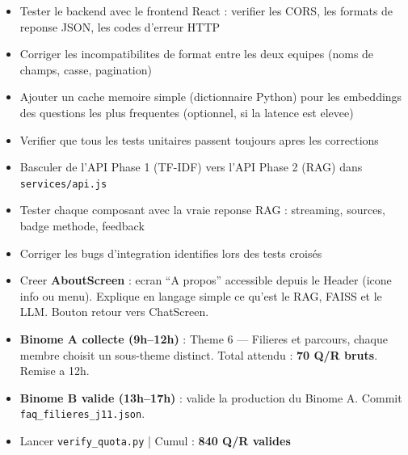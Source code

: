 \documentclass[11pt,a4paper]{article}
\begin{document}
\begin{ragbox}[Backend --- J11]
\begin{itemize}
    \item[$\square$] Tester le backend avec le frontend React : verifier les CORS, les formats de reponse JSON, les codes d'erreur HTTP
    \item[$\square$] Corriger les incompatibilites de format entre les deux equipes (noms de champs, casse, pagination)
    \item[$\square$] Ajouter un cache memoire simple (dictionnaire Python) pour les embeddings des questions les plus frequentes (optionnel, si la latence est elevee)
    \item[$\square$] Verifier que tous les tests unitaires passent toujours apres les corrections
\end{itemize}
\end{ragbox}

\begin{reactbox}[Frontend --- J11]
\begin{itemize}
    \item[$\square$] Basculer de l'API Phase 1 (TF-IDF) vers l'API Phase 2 (RAG) dans \texttt{services/api.js}
    \item[$\square$] Tester chaque composant avec la vraie reponse RAG : streaming, sources, badge methode, feedback
    \item[$\square$] Corriger les bugs d'integration identifies lors des tests croisés
    \item[$\square$] Creer \textbf{AboutScreen} : ecran ``A propos'' accessible depuis le Header (icone info ou menu). Explique en langage simple ce qu'est le RAG, FAISS et le LLM. Bouton retour vers ChatScreen.
\end{itemize}
\end{reactbox}

\begin{databox}[Data --- J11]
\begin{itemize}
    \item[$\square$] \textbf{Binome A collecte (9h--12h)} : Theme 6 --- Filieres et parcours, chaque membre choisit un sous-theme distinct. Total attendu : \textbf{70 Q/R bruts}. Remise a 12h.
    \item[$\square$] \textbf{Binome B valide (13h--17h)} : valide la production du Binome A. Commit \texttt{faq\_filieres\_j11.json}.
    \item[$\square$] Lancer \texttt{verify\_quota.py} | Cumul : \textbf{840 Q/R valides}
\end{itemize}
\end{databox}
\end{document}
